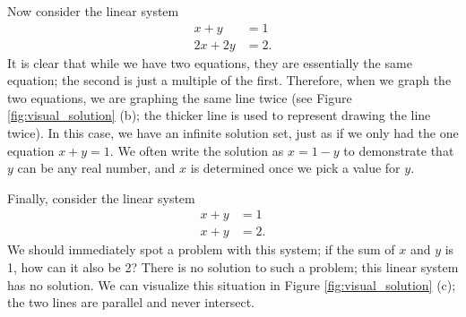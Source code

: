 Now consider the linear system \begin{align*} x+y&=1\\2x+2y&=2.\end{align*} It is clear that while we have two equations, they are essentially the same equation; the second is just a multiple of the first. Therefore, when we graph the two equations, we are graphing the same line twice (see Figure \ref{fig:visual_solution} (b); the thicker line is used to represent drawing the line twice). In this case, we have an infinite solution set, just as if we only had the one equation $x+y=1$. We often write the solution as $x=1-y$ to demonstrate that $y$ can be any real number, and $x$ is determined once we pick a value for $y$. 


\begin{myfigure}\begin{center}
 \label{fig:visual_solution}
\end{center}
\end{myfigure}

Finally, consider the linear system \begin{align*} x+y&=1\\x+y&=2.\end{align*} We should immediately spot a problem with this system; if the sum of $x$ and $y$ is 1, how can it also be 2? There is no solution to such a problem; this linear system has no solution. We can visualize this situation in Figure \ref{fig:visual_solution} (c); the two lines are parallel and never intersect.

